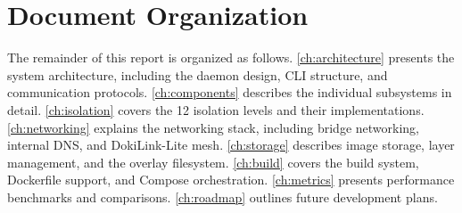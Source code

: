 \section{Document Organization}
\label{sec:organization}

The remainder of this report is organized as follows.
\cref{ch:architecture} presents the system architecture, including
the daemon design, CLI structure, and communication protocols.
\cref{ch:components} describes the individual subsystems in detail.
\cref{ch:isolation} covers the 12 isolation levels and their
implementations. \cref{ch:networking} explains the networking stack,
including bridge networking, internal DNS, and DokiLink-Lite mesh.
\cref{ch:storage} describes image storage, layer management, and
the overlay filesystem. \cref{ch:build} covers the build system,
Dockerfile support, and Compose orchestration. \cref{ch:metrics}
presents performance benchmarks and comparisons. \cref{ch:roadmap}
outlines future development plans.
